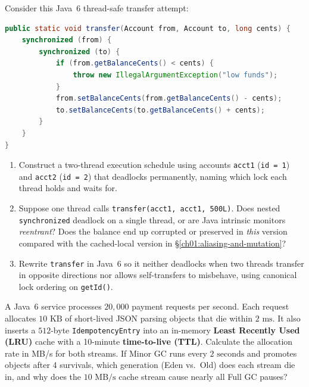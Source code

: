 \begin{exercise}
Consider this Java~6 thread-safe transfer attempt:
\begin{lstlisting}[language=Java]
public static void transfer(Account from, Account to, long cents) {
    synchronized (from) {
        synchronized (to) {
            if (from.getBalanceCents() < cents) {
                throw new IllegalArgumentException("low funds");
            }
            from.setBalanceCents(from.getBalanceCents() - cents);
            to.setBalanceCents(to.getBalanceCents() + cents);
        }
    }
}
\end{lstlisting}
\begin{enumerate}[label=(\alph*)]
  \item Construct a two-thread execution schedule using accounts \texttt{acct1} (\texttt{id = 1}) and \texttt{acct2} (\texttt{id = 2}) that deadlocks permanently, naming which lock each thread holds and waits for.
  \item Suppose one thread calls \texttt{transfer(acct1, acct1, 500L)}. Does nested \texttt{synchronized} deadlock on a single thread, or are Java intrinsic monitors \emph{reentrant}? Does the balance end up corrupted or preserved in \emph{this} version compared with the cached-local version in \S\ref{ch01:aliasing-and-mutation}?
  \item Rewrite \texttt{transfer} in Java~6 so it neither deadlocks when two threads transfer in opposite directions nor allows self-transfers to misbehave, using canonical lock ordering on \texttt{getId()}.
\end{enumerate}
\end{exercise}

\begin{exercise}
A Java~6 service processes $20{,}000$ payment requests per second. Each request allocates $10\text{ KB}$ of short-lived JSON parsing objects that die within $2\text{ ms}$. It also inserts a $512$-byte \texttt{IdempotencyEntry} into an in-memory \textbf{Least Recently Used (LRU)} cache with a 10-minute \textbf{time-to-live (TTL)}. Calculate the allocation rate in MB/s for both streams. If Minor GC runs every $2\text{ seconds}$ and promotes objects after 4 survivals, which generation (Eden vs.\ Old) does each stream die in, and why does the $10\text{ MB/s}$ cache stream cause nearly all Full GC pauses?
\end{exercise}

